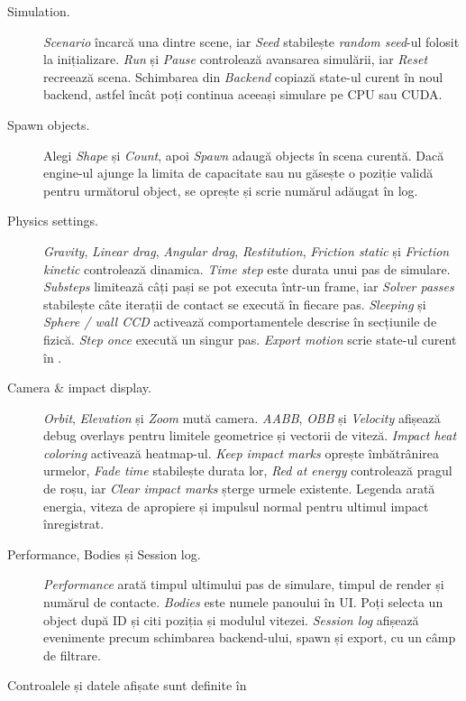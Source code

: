 \documentclass[11pt,a4paper]{article}
\begin{document}
\begin{description}
\item[Simulation.] \emph{Scenario} încarcă una dintre scene, iar
\emph{Seed} stabilește \emph{random seed}-ul folosit la inițializare.
\emph{Run} și \emph{Pause} controlează avansarea simulării,
iar \emph{Reset} recreează scena. Schimbarea din \emph{Backend}
copiază state-ul curent în noul backend, astfel încât poți continua
aceeași simulare pe CPU sau CUDA.
\item[Spawn objects.] Alegi \emph{Shape} și \emph{Count}, apoi
\emph{Spawn} adaugă objects în scena curentă. Dacă engine-ul
ajunge la limita de capacitate sau nu găsește o poziție validă
pentru următorul object, se oprește și scrie numărul adăugat în log.
\item[Physics settings.] \emph{Gravity}, \emph{Linear drag},
\emph{Angular drag}, \emph{Restitution}, \emph{Friction static}
și \emph{Friction kinetic} controlează dinamica.
\emph{Time step} este durata unui pas de simulare.
\emph{Substeps} limitează câți pași se pot executa într-un frame,
iar \emph{Solver passes} stabilește câte iterații de contact
se execută în fiecare pas. \emph{Sleeping} și \emph{Sphere / wall CCD}
activează comportamentele descrise în secțiunile de fizică.
\emph{Step once} execută un singur pas. \emph{Export motion} scrie
state-ul curent în .
\item[Camera \& impact display.] \emph{Orbit}, \emph{Elevation}
și \emph{Zoom} mută camera. \emph{AABB}, \emph{OBB} și
\emph{Velocity} afișează debug overlays pentru limitele geometrice
și vectorii de viteză. \emph{Impact heat coloring} activează heatmap-ul.
\emph{Keep impact marks} oprește îmbătrânirea urmelor, \emph{Fade time}
stabilește durata lor, \emph{Red at energy} controlează pragul
de roșu, iar \emph{Clear impact marks} șterge urmele existente.
Legenda arată energia, viteza de apropiere și impulsul normal
pentru ultimul impact înregistrat.
\item[Performance, Bodies și Session log.] \emph{Performance} arată
timpul ultimului pas de simulare, timpul de render și numărul de
contacte. \emph{Bodies} este numele panoului în UI. Poți selecta
un object după ID și citi poziția și modulul vitezei.
\emph{Session log} afișează evenimente precum schimbarea backend-ului,
spawn și export, cu un câmp de filtrare.
\end{description}
Controalele și datele afișate sunt definite în
\end{document}
